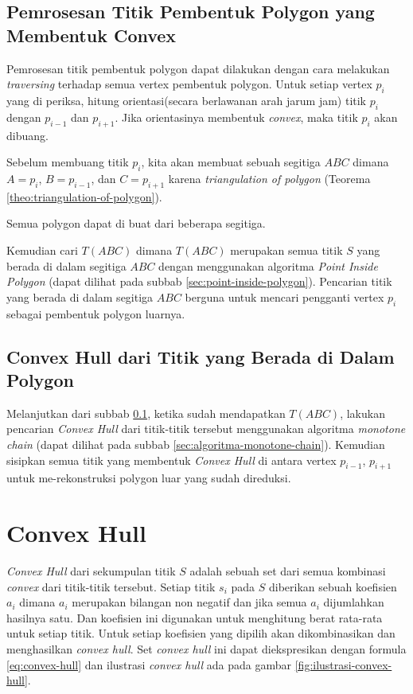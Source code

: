 \subsection{Pemrosesan Titik Pembentuk Polygon yang Membentuk Convex}
\label{sec:pemrosesan-titik-pembentuk-polygon-yang-membentuk-convex}
Pemrosesan titik pembentuk polygon dapat dilakukan dengan cara melakukan \textit{traversing} terhadap semua vertex pembentuk polygon. Untuk setiap vertex $p_i$ yang di periksa, hitung orientasi(secara berlawanan arah jarum jam) titik $p_i$ dengan $p_{i-1}$ dan $ p_{i+1}$. Jika orientasinya membentuk \textit{convex}, maka titik $p_i$ akan dibuang.
\par Sebelum membuang titik $p_i$, kita akan membuat sebuah segitiga $ABC$ dimana $A=p_i$, $B=p_{i-1}$, dan $C=p_{i+1}$ karena \textit{triangulation of polygon} (Teorema \ref{theo:triangulation-of-polygon}).
\begin{theo}
    \label{theo:triangulation-of-polygon}
	Semua polygon dapat di buat dari beberapa segitiga.
\end{theo}
Kemudian cari $T(ABC)$ dimana $T(ABC)$ merupakan semua titik $S$ yang berada di dalam segitiga $ABC$ dengan menggunakan algoritma \textit{Point Inside Polygon} (dapat dilihat pada subbab \ref{sec:point-inside-polygon}). Pencarian titik yang berada di dalam segitiga $ABC$ berguna untuk mencari pengganti vertex $p_i$ sebagai pembentuk polygon luarnya.

\subsection{Convex Hull dari Titik yang Berada di Dalam Polygon}
\label{sec:convex-hull-dari-titik-yang-berada-di-dalam-polygon}
Melanjutkan dari subbab \ref{sec:pemrosesan-titik-pembentuk-polygon-yang-membentuk-convex}, ketika sudah mendapatkan $T(ABC)$, lakukan pencarian \textit{Convex Hull} dari titik-titik tersebut menggunakan algoritma \textit{monotone chain} (dapat dilihat pada subbab \ref{sec:algoritma-monotone-chain}). Kemudian sisipkan semua titik yang membentuk \textit{Convex Hull} di antara vertex $p_{i-1}$, $p_{i+1}$ untuk me-rekonstruksi polygon luar yang sudah direduksi.

\section{Convex Hull}
\label{sec:convex-hull}
\textit{Convex Hull} dari sekumpulan titik $S$ adalah sebuah set dari semua kombinasi \textit{convex} dari titik-titik tersebut. Setiap titik $s_i$ pada $S$ diberikan sebuah koefisien $a_i$ dimana $a_i$ merupakan bilangan non negatif dan jika semua $a_i$ dijumlahkan hasilnya satu. Dan koefisien ini digunakan untuk menghitung berat rata-rata untuk setiap titik. Untuk setiap koefisien yang dipilih akan dikombinasikan dan menghasilkan \textit{convex hull}. Set \textit{convex hull} ini dapat diekspresikan dengan formula \eqref{eq:convex-hull} dan ilustrasi \textit{convex hull} ada pada gambar \ref{fig:ilustrasi-convex-hull}.

